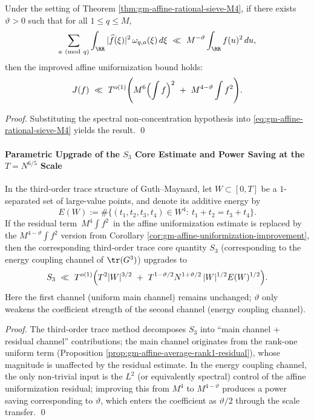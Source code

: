 \begin{corollary}[Spectral Non-Concentration \texorpdfstring{$\Rightarrow$}{=>} Affine Uniformization Power Improvement: From \texorpdfstring{$M^4$}{M4} to \texorpdfstring{$M^{4-\vartheta}$}{M4-vtheta}]\label{cor:gm-affine-uniformization-improvement}
Under the setting of Theorem \ref{thm:gm-affine-rational-sieve-M4}, if there exists \(\vartheta>0\) such that for all \(1\le q\le M\),
\[
\sum_{a\ (\mathrm{mod}\ q)}\int_{\RR} |\widehat f(\xi)|^2\,\omega_{q,a}(\xi)\,d\xi
\ \ll\
M^{-\vartheta}\int_{\RR} f(u)^2\,du,
\]
then the improved affine uniformization bound holds:
\[
J(f)\ \ll\ T^{o(1)}
\Biggl(
M^6\Bigl(\int f\Bigr)^2
\ +\
M^{4-\vartheta}\int f^2
\Biggr).
\]
\end{corollary}

\begin{proof}
Substituting the spectral non-concentration hypothesis into \eqref{eq:gm-affine-rational-sieve-M4} yields the result. \qed
\end{proof}

\paragraph{Parametric Upgrade of the \texorpdfstring{$S_3$}{S3} Core Estimate and Power Saving at the \texorpdfstring{$T=N^{6/5}$}{T=N^{6/5}} Scale}
\begin{proposition}\label{prop:gm-S3-upgrade-vtheta}
In the third-order trace structure of Guth--Maynard, let \(W\subset[0,T]\) be a \(1\)-separated set of large-value points, and denote its additive energy by
\[
E(W):=\#\{(t_1,t_2,t_3,t_4)\in W^4:\ t_1+t_2=t_3+t_4\}.
\]
If the residual term \(\,M^4\int f^2\,\) in the affine uniformization estimate is replaced by the \(M^{4-\vartheta}\int f^2\) version from Corollary \ref{cor:gm-affine-uniformization-improvement}, then the corresponding third-order trace core quantity \(S_3\) (corresponding to the energy coupling channel of \(\tr(G^3)\)) upgrades to
\[
S_3\ \ll\ T^{o(1)}
\Bigl(
T^2|W|^{3/2}
\ +\
T^{1-\vartheta/2}N^{1+\vartheta/2}\,|W|^{1/2}E(W)^{1/2}
\Bigr).
\]
Here the first channel (uniform main channel) remains unchanged; \(\vartheta\) only weakens the coefficient strength of the second channel (energy coupling channel).
\end{proposition}

\begin{proof}
The third-order trace method decomposes \(S_3\) into ``main channel + residual channel'' contributions; the main channel originates from the rank-one uniform term (Proposition \ref{prop:gm-affine-average-rank1-residual}), whose magnitude is unaffected by the residual estimate.
In the energy coupling channel, the only non-trivial input is the \(L^2\) (or equivalently spectral) control of the affine uniformization residual; improving this from \(M^4\) to \(M^{4-\vartheta}\) produces a power saving corresponding to \(\vartheta\), which enters the coefficient as \(\vartheta/2\) through the scale transfer. \qed
\end{proof}

